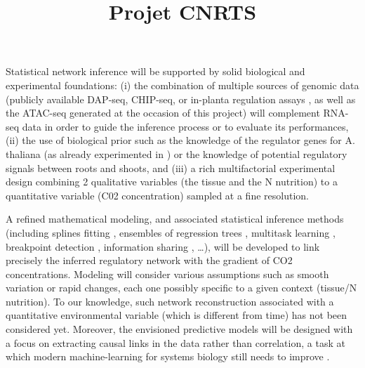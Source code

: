 \documentclass{article}
\title{\textbf{Projet CNRTS}}
\begin{document}
\cite{geurts2018dyngenie3, Cirrone2020,  Gibbs2021}

\cite{haury2012tigress}


Statistical network inference will be supported by solid biological and experimental foundations: 
(i) the combination of multiple sources of genomic data (publicly available DAP-seq, CHIP-seq, or in-planta regulation assays \cite{Brooks2020}, as well as the ATAC-seq generated at the occasion of this project) will complement RNA-seq data in order to guide the inference process or to evaluate its performances,
(ii) the use of biological prior such as the knowledge of the regulator genes for A. thaliana (as already experimented in \cite{Cassan2021}) or the knowledge of potential regulatory signals between roots and shoots, and
(iii) a rich multifactorial experimental design combining 2 qualitative variables (the tissue and the N nutrition) to a quantitative variable (C02 concentration) sampled at a fine resolution.

A refined mathematical modeling, and associated statistical inference methods (including splines fitting \cite{moanin}, ensembles of regression trees \cite{genie3}, multitask learning \cite{bonneaux}, breakpoint detection \cite{LebreEtal2010}, information sharing \cite{DondelingerEtal2012,DondelingerEtal2013}, …), will be developed to link precisely the inferred regulatory network with the gradient of CO2 concentrations. Modeling will consider various assumptions such as smooth variation or rapid changes, each one possibly specific to a given context (tissue/N nutrition). To our knowledge, such network reconstruction associated with a quantitative environmental variable (which is different from time) has not been considered yet. Moreover, the envisioned predictive models will be designed with a focus on extracting causal links in the data rather than correlation, a task at which modern machine-learning for systems biology still needs to improve \cite{lecca2021}.

\newpage



\end{document}
